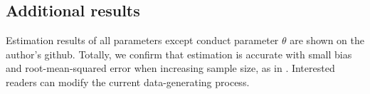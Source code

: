 \documentclass[11pt, a4paper]{article}
\begin{document}


\subsection{Additional results}
Estimation results of all parameters except conduct parameter $\theta$ are shown on the author's github. 
Totally, we confirm that estimation is accurate with small bias and root-mean-squared error when increasing sample size, as in \cite{matsumura2023resolving}.
Interested readers can modify the current data-generating process.
\end{document}
